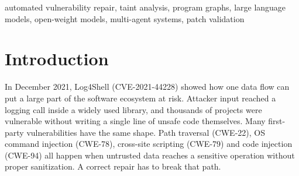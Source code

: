 \documentclass[conference]{IEEEtran}
\makeatletter
\newcommand{\res}[1]{\ifcsname gp@#1\endcsname\csname gp@#1\endcsname\else\textbf{?}\fi}
\makeatother
\begin{document}
\begin{abstract}
LLM agents can now write patches for security vulnerabilities, and most repair systems
accept a patch once the code builds and the existing tests pass. Project tests rarely
contain an attack, so a patch can pass every test while untrusted input still reaches
the dangerous call. We present GraphPatch, a multi-agent repair framework for Java in
which one source-to-sink taint graph does two jobs: it selects the code the agents see,
and it decides, after the build and the tests, whether a candidate patch actually closed
the vulnerable path. A Planner, a Coder and a Critic work in a loop; when a candidate
still leaves a path open, the Critic receives that concrete path. Final verdicts use
held-out oracles that no agent sees: the paths removed by the developers' own fix, and
proof-of-vulnerability tests where they exist. The whole system runs on free and
open-source software, with the open-weight Qwen2.5-Coder-7B model served locally by
Ollama on a CPU-only laptop. On the taint checker's calibration over 115 CWE-Bench-Java
vulnerabilities, the developers' fix removes at least one reported path in 15 cases. On
the 9 of those that build and test in our environment, \res{all@stillvuln} of
\res{all@passing} LLM patches that passed the existing tests were still vulnerable.
GraphPatch verified
\res{full@V} of 9, against \res{single@V} for the single prompt, \res{nograph@V} for the
multi-agent baseline and 5 for a deterministic rule with no LLM.
\end{abstract}

\begin{IEEEkeywords}
automated vulnerability repair, taint analysis, program graphs, large language models,
open-weight models, multi-agent systems, patch validation
\end{IEEEkeywords}

\section{Introduction}

In December 2021, Log4Shell (CVE-2021-44228) showed how one data flow can put a large
part of the software ecosystem at risk. Attacker input reached a logging call inside a
widely used library, and thousands of projects were vulnerable without writing a single
line of unsafe code themselves. Many first-party vulnerabilities have the same shape.
Path traversal (CWE-22), OS command injection (CWE-78), cross-site scripting (CWE-79) and
code injection (CWE-94) all happen when untrusted data reaches a sensitive operation
without proper sanitization. A correct repair has to break that path.
\end{document}
